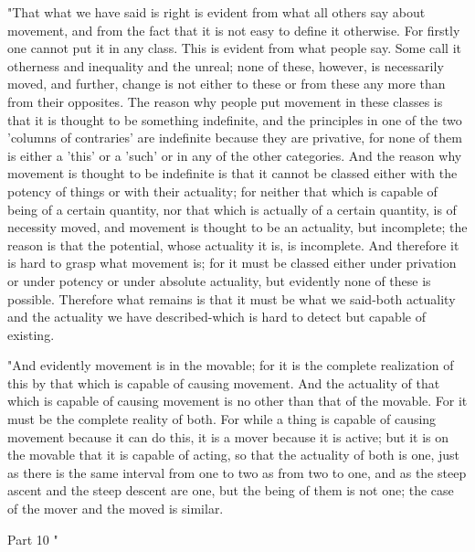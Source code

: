"That what we have said is right is evident from what all others say
about movement, and from the fact that it is not easy to define it
otherwise. For firstly one cannot put it in any class. This is evident
from what people say. Some call it otherness and inequality and the
unreal; none of these, however, is necessarily moved, and further,
change is not either to these or from these any more than from their
opposites. The reason why people put movement in these classes is
that it is thought to be something indefinite, and the principles
in one of the two 'columns of contraries' are indefinite because they
are privative, for none of them is either a 'this' or a 'such' or
in any of the other categories. And the reason why movement is thought
to be indefinite is that it cannot be classed either with the potency
of things or with their actuality; for neither that which is capable
of being of a certain quantity, nor that which is actually of a certain
quantity, is of necessity moved, and movement is thought to be an
actuality, but incomplete; the reason is that the potential, whose
actuality it is, is incomplete. And therefore it is hard to grasp
what movement is; for it must be classed either under privation or
under potency or under absolute actuality, but evidently none of these
is possible. Therefore what remains is that it must be what we said-both
actuality and the actuality we have described-which is hard to detect
but capable of existing. 

"And evidently movement is in the movable; for it is the complete
realization of this by that which is capable of causing movement.
And the actuality of that which is capable of causing movement is
no other than that of the movable. For it must be the complete reality
of both. For while a thing is capable of causing movement because
it can do this, it is a mover because it is active; but it is on the
movable that it is capable of acting, so that the actuality of both
is one, just as there is the same interval from one to two as from
two to one, and as the steep ascent and the steep descent are one,
but the being of them is not one; the case of the mover and the moved
is similar. 

Part 10 "

